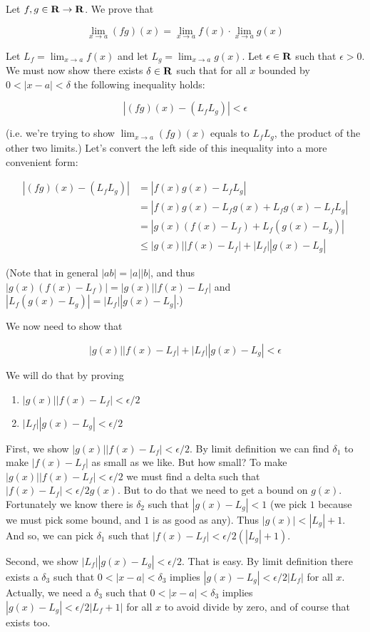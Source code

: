 Let $f,g\in\mathbf{R}\to\mathbf{R}$. We prove that

\[\lim_{x\to a}(fg)(x)=\lim_{x\to a}f(x)\cdot\lim_{x\to a}g(x)\]

Let $L_f=\lim_{x\to a}f(x)$ and let $L_g=\lim_{x\to a}g(x)$. Let
$\epsilon\in\mathbf{R}$ such that $\epsilon>0$. We must now show there exists
$\delta\in\mathbf{R}$ such that for all $x$ bounded by $0<|x-a|<\delta$ the following
inequality holds:

\[|(fg)(x)-(L_fL_g)|<\epsilon\]

(i.e. we're trying to show $\lim_{x\to a}(fg)(x)$ equals to $L_fL_g$,
the product of the other two limits.) Let's convert the left side of
this inequality into a more convenient form:

\begin{align*}
    |(fg)(x)-(L_fL_g)|&=|f(x)g(x)-L_fL_g|\\
    &=|f(x)g(x)-L_fg(x)+L_fg(x)-L_fL_g|\\
    &=|g(x)(f(x)-L_f)+L_f(g(x)-L_g)|\\
    &\leq |g(x)||f(x)-L_f|+|L_f||g(x)-L_g|
\end{align*}

(Note that in general $|ab|=|a||b|$, and thus
$|g(x)(f(x)-L_f)|=|g(x)||f(x)-L_f|$ and
$|L_f(g(x)-L_g)|=|L_f||g(x)-L_g|$.)

\vs

We now need to show that

\[|g(x)||f(x)-L_f|+|L_f||g(x)-L_g|<\epsilon\]

We will do that by proving

\begin{enumerate}
    \item $|g(x)||f(x)-L_f|<\epsilon/2$
    \item $|L_f||g(x)-L_g|<\epsilon/2$
\end{enumerate}

First, we show $|g(x)||f(x)-L_f|<\epsilon/2$. By limit definition we can find
$\delta_1$ to make $|f(x)-L_f|$ as small as we like. But how small? To make
$|g(x)||f(x)-L_f|<\epsilon/2$ we must find a delta such that
$|f(x)-L_f|<\epsilon/2g(x)$. But to do that we need to get a bound on
$g(x)$. Fortunately we know there is $\delta_2$ such that
$|g(x)-L_g|<1$ (we pick $1$ because we must pick some bound, and $1$
is as good as any). Thus $|g(x)|<|L_g|+1$. And so, we can pick
$\delta_1$ such that $|f(x)-L_f|<\epsilon/2(|L_g|+1)$.

\vs

Second, we show $|L_f||g(x)-L_g|<\epsilon/2$. That is easy. By limit
definition there exists a $\delta_3$ such that $0<|x-a|<\delta_3$ implies
$|g(x)-L_g|<\epsilon/2|L_f|$ for all $x$. Actually, we need a
$\delta_3$ such that $0<|x-a|<\delta_3$ implies
$|g(x)-L_g|<\epsilon/2|L_f+1|$ for all $x$ to avoid divide by zero, and of
course that exists too.

